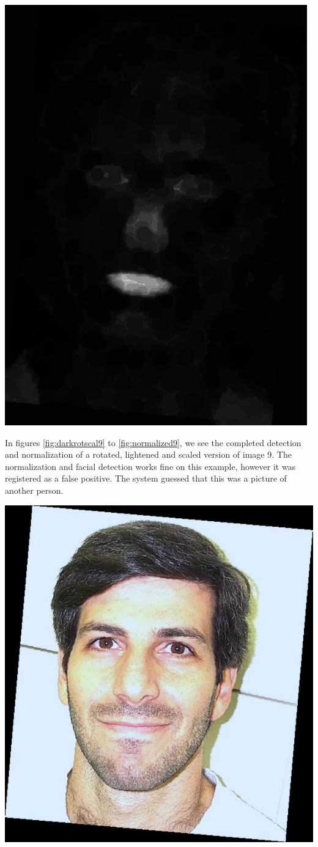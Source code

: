 \begin{Figure}
  \centering
    \includegraphics[width=0.5\columnwidth]{im7_mouth.jpg}
\end{Figure}


In figures \ref{fig:darkrotscal9} to \ref{fig:normalized9}, we see the completed detection and normalization of a rotated, lightened and scaled version of image 9. The normalization and facial detection works fine on this example, however it was registered as a false positive. The system guessed that this was a picture of another person. 


\begin{Figure}
  \centering
    \includegraphics[width=0.5\columnwidth]{im9_img.jpg}
\end{Figure}

